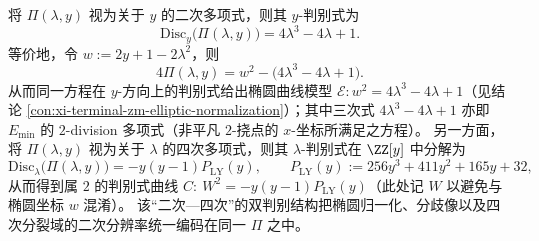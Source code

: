 \begin{remark}\label{rem:xi-terminal-zm-pi-double-discriminant-bridge}
将 \(\Pi(\lambda,y)\) 视为关于 \(y\) 的二次多项式，则其 \(y\)-判别式为
\[
\mathrm{Disc}_{y}\bigl(\Pi(\lambda,y)\bigr)=4\lambda^{3}-4\lambda+1.
\]
等价地，令 \(w:=2y+1-2\lambda^{2}\)，则
\[
4\Pi(\lambda,y)=w^{2}-\bigl(4\lambda^{3}-4\lambda+1\bigr).
\]
从而同一方程在 \(y\)-方向上的判别式给出椭圆曲线模型 \(\mathcal E:w^{2}=4\lambda^{3}-4\lambda+1\)（见结论 \ref{con:xi-terminal-zm-elliptic-normalization}）；其中三次式 \(4\lambda^{3}-4\lambda+1\) 亦即 \(E_{\min}\) 的 \(2\)-division 多项式（非平凡 \(2\)-挠点的 \(x\)-坐标所满足之方程）。
另一方面，将 \(\Pi(\lambda,y)\) 视为关于 \(\lambda\) 的四次多项式，则其 \(\lambda\)-判别式在 \(\ZZ[y]\) 中分解为
\[
\mathrm{Disc}_{\lambda}\bigl(\Pi(\lambda,y)\bigr)=-y(y-1)P_{\mathrm{LY}}(y),
\qquad
P_{\mathrm{LY}}(y):=256y^{3}+411y^{2}+165y+32,
\]
从而得到属 \(2\) 的判别式曲线 \(C:\ W^{2}=-y(y-1)P_{\mathrm{LY}}(y)\)（此处记 \(W\) 以避免与椭圆坐标 \(w\) 混淆）。
该“二次—四次”的双判别结构把椭圆归一化、分歧像以及四次分裂域的二次分辨率统一编码在同一 \(\Pi\) 之中。
\end{remark}


